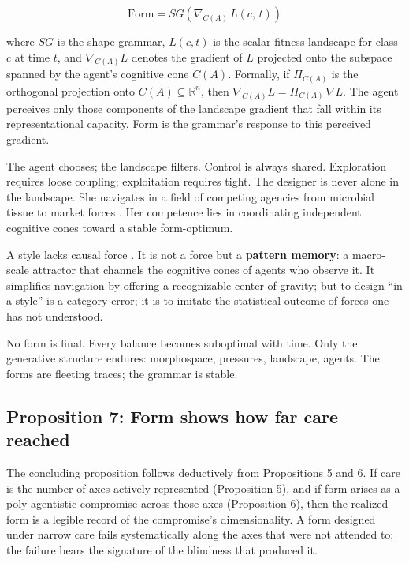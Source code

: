 \begin{equation}
\mathrm{Form} = SG\!\left(\nabla_{C(A)}\, L(c,\, t)\right)
\label{eq:core}
\end{equation}

\noindent where $SG$ is the shape grammar, $L(c,t)$ is the scalar fitness landscape for class $c$ at time $t$, and $\nabla_{C(A)} L$ denotes the gradient of $L$ projected onto the subspace spanned by the agent's cognitive cone $C(A)$. Formally, if $\Pi_{C(A)}$ is the orthogonal projection onto $C(A) \subseteq \mathbb{R}^n$, then $\nabla_{C(A)} L = \Pi_{C(A)}\, \nabla L$. The agent perceives only those components of the landscape gradient that fall within its representational capacity. Form is the grammar's response to this perceived gradient.

The agent chooses; the landscape filters. Control is always shared. Exploration requires loose coupling; exploitation requires tight. The designer is never alone in the landscape. She navigates in a field of competing agencies from microbial tissue to market forces \parencite{Levin2022}. Her competence lies in coordinating independent cognitive cones toward a stable form-optimum.

A style lacks causal force \parencite{Kubler1962, Michl1995}. It is not a force but a \textbf{pattern memory}: a macro-scale attractor that channels the cognitive cones of agents who observe it. It simplifies navigation by offering a recognizable center of gravity; but to design ``in a style'' is a category error; it is to imitate the statistical outcome of forces one has not understood.

No form is final. Every balance becomes suboptimal with time. Only the generative structure endures: morphospace, pressures, landscape, agents. The forms are fleeting traces; the grammar is stable.

\subsection{Proposition 7: Form shows how far care reached}
\label{sec:prop7}

The concluding proposition follows deductively from Propositions 5 and 6. If care is the number of axes actively represented (Proposition 5), and if form arises as a poly-agentistic compromise across those axes (Proposition 6), then the realized form is a legible record of the compromise's dimensionality. A form designed under narrow care fails systematically along the axes that were not attended to; the failure bears the signature of the blindness that produced it.

